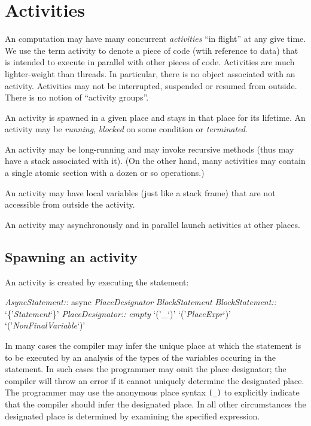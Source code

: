 \chapter{Activities}\label{XtenActivities}

An \Xten{} computation may have many concurrent {\em activities} ``in
flight'' at any give time. We use the term activity to denote a piece
of code (wtih reference to data) that is intended to execute in
parallel with other pieces of code. Activities are much lighter-weight
than threads. In particular, there is no object associated with an
activity. Activities may not be interrupted, suspended or resumed from
outside. There is no notion of ``activity groups''. 

An activity is spawned in a given place and stays in that place for
its lifetime.  An activity may be {\em running}, {\em blocked} on some
condition or {\em terminated}.

An activity may be long-running and may invoke recursive methods (thus
may have a stack associated with it). (On the other hand, many
activities may contain a single atomic section with a dozen or so
operations.)

An activity may have local variables (just like a stack frame) that
are not accessible from outside the activity.

An activity may asynchronously and in parallel launch activities at
other places.

\section{Spawning an activity}\label{AsynchronousActivity}\label{AsyncActivity}
An activity is created by executing the statement:
\begin{x10}
{\cf\em{}AsyncStatement::}
   async {\cf\em{}PlaceDesignator} {\cf\em{}BlockStatement}
{\cf\em{}BlockStatement::}
  `\{'{\cf\em{}Statement}`\}' 
{\cf\em{}PlaceDesignator::}
    {\cf\em{}empty}
    `('\_`)'
    `('{\cf\em{}PlaceExpr}`)'
    `('{\cf\em{}NonFinalVariable}`)'
\end{x10} 

In many cases the compiler may infer the unique place at which the
statement is to be executed by an analysis of the types of the
variables occuring in the statement. In such cases the programmer may
omit the place designator; the compiler will throw an error if it
cannot uniquely determine the designated place. The programmer may use
the anonymous place syntax {\tt (\_)} to explicitly indicate that the
compiler should infer the designated place. In all other circumstances
the designated place is determined by examining the specified
expression.

